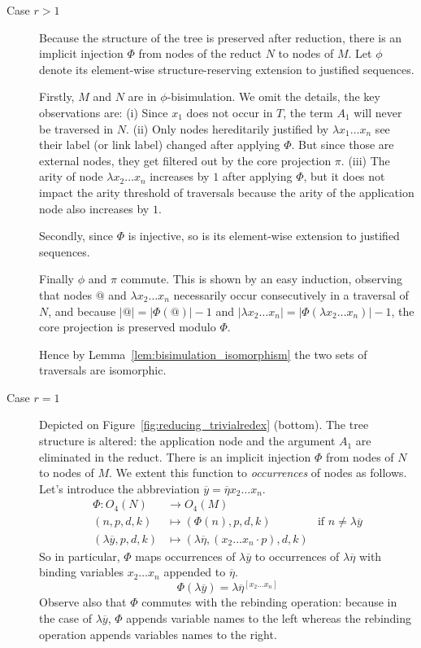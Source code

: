 \documentclass{elsarticle}
\theoremstyle{plain}
\theoremstyle{definition}
\theoremstyle{remark}
\def\coresymbol{\pi} %
\begin{document}
    \begin{description}
    \item[Case $r>1$] Because the structure of the tree is preserved after reduction, there is an implicit injection $\Phi$ from nodes of the reduct $N$ to nodes of $M$. Let $\phi$ denote its element-wise structure-reserving  extension to justified sequences.

    Firstly, $M$ and $N$ are in $\phi$-bisimulation. We omit the details, the key observations are:
    (i) Since $x_1$ does not occur in $T$, the term $A_1$ will never be traversed in $N$.
    (ii) Only nodes hereditarily justified by $\lambda x_1 \ldots x_n$ see their label (or link label) changed after applying $\Phi$. But since those are external nodes, they get filtered out by the core projection $\coresymbol$.
    (iii) The arity of node $\lambda x_2 \ldots x_n$ increases by $1$ after applying $\Phi$, but it does not impact the arity threshold of traversals because the arity of the application node also increases by $1$.

    Secondly, since $\Phi$ is injective, so is its element-wise extension to justified sequences.

    Finally $\phi$ and $\coresymbol$ commute. This is shown by an easy induction, observing that nodes $@$ and $\lambda x_2\ldots x_n$ necessarily occur consecutively in a traversal of $N$, and because $|@| = |\Phi(@)| -1$ and $|\lambda x_2\ldots x_n| = |\Phi(\lambda x_2\ldots x_n)| - 1$, the core projection is preserved modulo $\Phi$.

    Hence by Lemma~\ref{lem:bisimulation_isomorphism} the two sets of traversals are isomorphic.

    \item[Case $r=1$] Depicted on Figure~\ref{fig:reducing_trivialredex} (bottom). The tree structure is altered: the application node and the argument $A_1$ are eliminated in the reduct. There is an implicit injection $\Phi$ from nodes of $N$ to nodes of $M$. We extent this function to \emph{occurrences} of nodes as follows. Let's introduce the abbreviation $\overline{y} = \overline\eta x_2 \ldots x_n$.
    \begin{align*}
        \Phi\colon O_4(N) &\rightarrow O_4(M) \\
        (n,p,d,k) &\longmapsto (\Phi(n),p,d,k) & \mbox{if $n\neq\lambda\overline{y}$} \\
        (\lambda\overline{y},p,d,k) &\longmapsto (\lambda\overline\eta,(x_2 \ldots x_n \cdot p),d,k)
    \end{align*}
    So in particular, $\Phi$ maps occurrences of $\lambda\overline{y}$ to occurrences of $\lambda\overline\eta$ with binding variables $x_2 \ldots x_n$ appended to $\overline\eta$.
    \begin{equation}
        \Phi(\lambda\overline{y})
        =
        \lambda\overline\eta^{[x_2\ldots x_n]}
        \label{eqn:phi_maps_lambday_to_lambdaeta}
    \end{equation}
    Observe also that $\Phi$ commutes with the rebinding operation: because in the case of $\lambda\overline{y}$, $\Phi$ appends variable names to the left whereas the rebinding operation appends variables names to the right.


\end{description}
\end{document}

